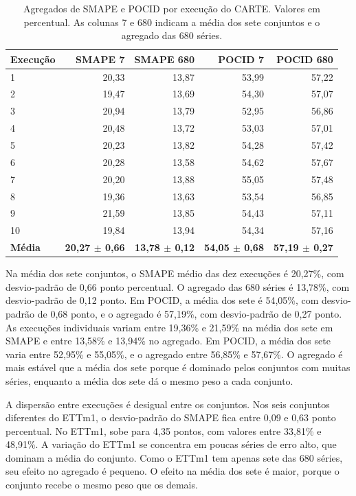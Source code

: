 \begin{table}[H]
\footnotesize
\centering
\setlength{\tabcolsep}{4pt}
\caption[Agregados de SMAPE e POCID por execução.]{Agregados de SMAPE e POCID por execução do CARTE. Valores em percentual. As colunas 7 e 680 indicam a média dos sete conjuntos e o agregado das 680 séries.}
\label{tab:execucoes-agregados}
\begin{tabular}{@{}lrrrr@{}}
\toprule
\textbf{Execução} & \textbf{SMAPE 7} & \textbf{SMAPE 680} & \textbf{POCID 7} & \textbf{POCID 680} \\
\midrule
1 & 20,33 & 13,87 & 53,99 & 57,22 \\
2 & 19,47 & 13,69 & 54,30 & 57,07 \\
3 & 20,94 & 13,79 & 52,95 & 56,86 \\
4 & 20,48 & 13,72 & 53,03 & 57,01 \\
5 & 20,23 & 13,82 & 54,28 & 57,42 \\
6 & 20,28 & 13,58 & 54,62 & 57,67 \\
7 & 20,20 & 13,88 & 55,05 & 57,48 \\
8 & 19,36 & 13,63 & 53,54 & 56,85 \\
9 & 21,59 & 13,85 & 54,43 & 57,11 \\
10 & 19,84 & 13,94 & 54,34 & 57,16 \\
\midrule
\textbf{Média} & \textbf{20,27 $\pm$ 0,66} & \textbf{13,78 $\pm$ 0,12} & \textbf{54,05 $\pm$ 0,68} & \textbf{57,19 $\pm$ 0,27} \\
\bottomrule
\end{tabular}
\end{table}

Na média dos sete conjuntos, o SMAPE médio das dez execuções é 20,27\%, com desvio-padrão de 0,66 ponto percentual. O agregado das 680 séries é 13,78\%, com desvio-padrão de 0,12 ponto. Em POCID, a média dos sete é 54,05\%, com desvio-padrão de 0,68 ponto, e o agregado é 57,19\%, com desvio-padrão de 0,27 ponto. As execuções individuais variam entre 19,36\% e 21,59\% na média dos sete em SMAPE e entre 13,58\% e 13,94\% no agregado. Em POCID, a média dos sete varia entre 52,95\% e 55,05\%, e o agregado entre 56,85\% e 57,67\%. O agregado é mais estável que a média dos sete porque é dominado pelos conjuntos com muitas séries, enquanto a média dos sete dá o mesmo peso a cada conjunto.

A dispersão entre execuções é desigual entre os conjuntos. Nos seis conjuntos diferentes do ETTm1, o desvio-padrão do SMAPE fica entre 0,09 e 0,63 ponto percentual. No ETTm1, sobe para 4,35 pontos, com valores entre 33,81\% e 48,91\%. A variação do ETTm1 se concentra em poucas séries de erro alto, que dominam a média do conjunto. Como o ETTm1 tem apenas sete das 680 séries, seu efeito no agregado é pequeno. O efeito na média dos sete é maior, porque o conjunto recebe o mesmo peso que os demais.

